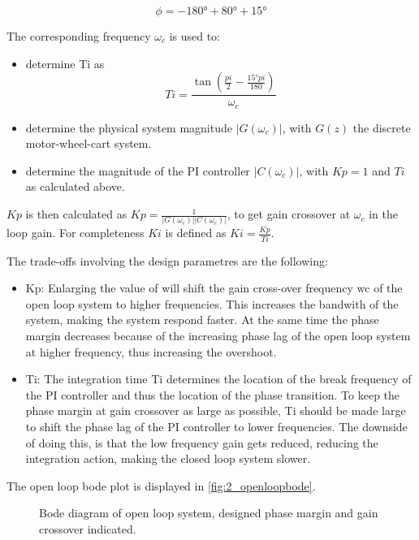 \documentclass[a4paper]{article}
\newcommand{\newpar}{\vspace{.3cm}\noindent}
\begin{document}
\begin{equation}
    \phi = -180° + 80° + 15°
\end{equation}

\newpar
The corresponding frequency \(\omega_{c}\) is used to:

\begin{itemize}
    \item determine Ti as 
        \begin{equation}
            Ti = \frac{\tan \left( \frac{pi}{2} - \frac{15° pi}{180} \right)}{\omega_{c}}
        \end{equation}
    \item determine the physical system magnitude \( |G(\omega_{c})| \), with \(G(z)\) the discrete motor-wheel-cart system.
    \item determine the magnitude of the PI controller \( |C(\omega_{c})| \), with \(Kp = 1\) and \(Ti\) as calculated above.
\end{itemize}

\newpar
\(Kp\) is then calculated as \(Kp = \frac{1}{|G(\omega_{c})||C(\omega_{c})|} \), to get gain crossover at \(\omega_{c} \) in the loop gain. For completeness \(Ki\) is defined as \(Ki = \frac{Kp}{Ti} \).

\newpar
The trade-offs involving the design parametres are the following:

\begin{itemize}
    \item Kp: Enlarging the value of will shift the gain cross-over frequency wc of the open loop system to higher frequencies. This increases the bandwith of the system, making the system respond faster. At the same time the phase margin decreases because of the increasing phase lag of the open loop system at higher frequency, thus increasing the overshoot.
    \item Ti: The integration time Ti determines the location of the break frequency of the PI controller and thus the location of the phase transition. To keep the phase margin at gain crossover as large as possible, Ti should be made large to shift the phase lag of the PI controller to lower frequencies. The downside of doing this, is that the low frequency gain gets reduced, reducing the integration action, making the closed loop system slower.
\end{itemize}

\newpar
The open loop bode plot is displayed in \autoref{fig:2_openloopbode}.

\begin{figure}[H]
    \caption{Bode diagram of open loop system, designed phase margin and gain crossover indicated.}
    \label{fig:2_openloopbode}
\end{figure}
\end{document}
